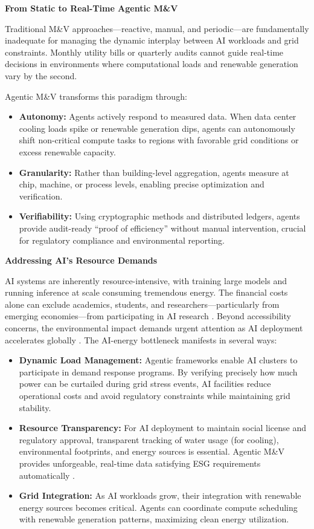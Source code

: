 \documentclass[11pt,a4paper]{article}
\begin{document}
\begin{itemize}
    \textbf{From Static to Real-Time Agentic M\&V}
    
    Traditional M\&V approaches—reactive, manual, and periodic—are fundamentally inadequate for managing the dynamic interplay between AI workloads and grid constraints. Monthly utility bills or quarterly audits cannot guide real-time decisions in environments where computational loads and renewable generation vary by the second.
    
    Agentic M\&V transforms this paradigm through:
    \begin{itemize}
        \item \textbf{Autonomy:} Agents actively respond to measured data. When data center cooling loads spike or renewable generation dips, agents can autonomously shift non-critical compute tasks to regions with favorable grid conditions or excess renewable capacity.
        \item \textbf{Granularity:} Rather than building-level aggregation, agents measure at chip, machine, or process levels, enabling precise optimization and verification.
        \item \textbf{Verifiability:} Using cryptographic methods and distributed ledgers, agents provide audit-ready ``proof of efficiency'' without manual intervention, crucial for regulatory compliance and environmental reporting.
    \end{itemize}


    \textbf{Addressing AI's Resource Demands}
    
    AI systems are inherently resource-intensive, with training large models and running inference at scale consuming tremendous energy. The financial costs alone can exclude academics, students, and researchers—particularly from emerging economies—from participating in AI research \cite{schwartz2019green}. Beyond accessibility concerns, the environmental impact demands urgent attention as AI deployment accelerates globally \cite{strubell2019energy, ieee2025access}. The AI-energy bottleneck manifests in several ways:
    \begin{itemize}
        \item \textbf{Dynamic Load Management:} Agentic frameworks enable AI clusters to participate in demand response programs. By verifying precisely how much power can be curtailed during grid stress events, AI facilities reduce operational costs and avoid regulatory constraints while maintaining grid stability.
        \item \textbf{Resource Transparency:} For AI deployment to maintain social license and regulatory approval, transparent tracking of water usage (for cooling), environmental footprints, and energy sources is essential. Agentic M\&V provides unforgeable, real-time data satisfying ESG requirements automatically \cite{energies2024}.
        \item \textbf{Grid Integration:} As AI workloads grow, their integration with renewable energy sources becomes critical. Agents can coordinate compute scheduling with renewable generation patterns, maximizing clean energy utilization.
    \end{itemize}



\end{itemize}
\end{document}
